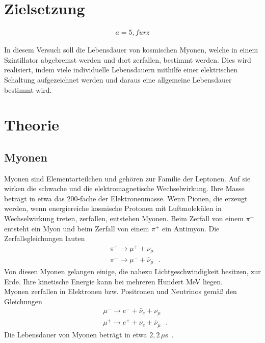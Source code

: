 
  \section{Zielsetzung}

    \begin{align} a=5, furz \end{align}



    In diesem Versuch soll die Lebensdauer von kosmischen Myonen,
    welche in einem Szintillator abgebremst werden und dort zerfallen,
    bestimmt werden. Dies wird realisiert, indem viele individuelle Lebensdauern
    mithilfe einer elektrischen Schaltung
    aufgezeichnet werden und daraus eine allgemeine Lebensdauer bestimmt wird.


  \section{Theorie}

    \subsection{Myonen}

    Myonen sind Elementarteilchen und gehören zur Familie der Leptonen.
    Auf sie wirken die schwache und die elektromagnetische Wechselwirkung.
    Ihre Masse beträgt in etwa das 200-fache der Elektronenmasse.
    Wenn Pionen, die erzeugt werden, wenn energiereiche kosmische Protonen
    mit Luftmolekülen in Wechselwirkung treten, zerfallen, entstehen Myonen.
    Beim Zerfall von einem $\pi^-$ entsteht ein Myon und beim Zerfall von
    einem $\pi^+$ ein Antimyon. Die Zerfallsgleichungen lauten
    \begin{align*}
      &\pi^+ \to \mu^+ +\nu_{\mu}\\
      &\pi^- \to \mu^- +\bar{\nu}_{\mu}\,\,\,\,.
    \end{align*}
    Von diesen Myonen gelangen einige, die nahezu Lichtgeschwindigkeit
    besitzen, zur Erde. Ihre kinetische Energie kann bei mehreren Hundert MeV
    liegen. \\
    Myonen zerfallen in Elektronen bzw. Positronen und Neutrinos gemäß den Gleichungen
    \begin{align*}
      &\mu^- \to e^- +\bar{\nu}_e+\nu_{\mu}\\
      &\mu^+ \to e^+ +\nu_e +\bar{\nu}_{\mu}\,\,\,\,.
    \end{align*}
    Die Lebensdauer von Myonen beträgt in etwa $2,2\,\mu$s~\cite{pdg}.

